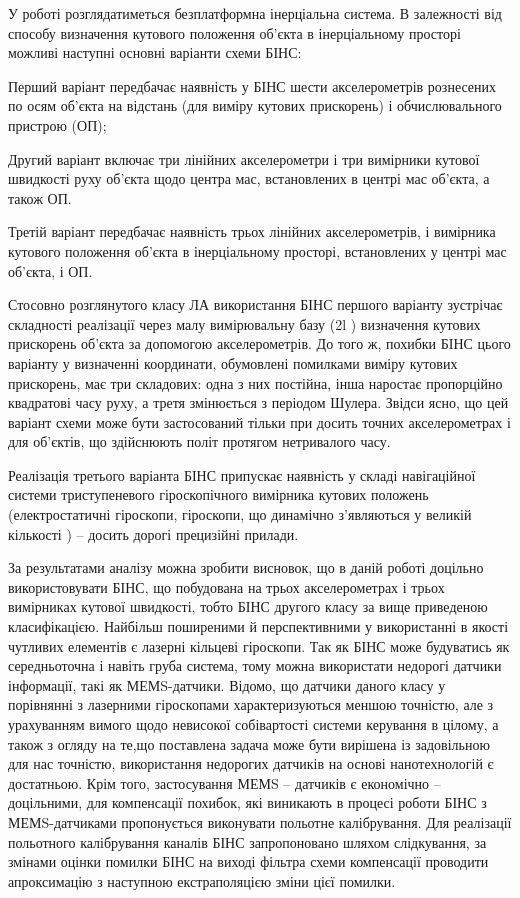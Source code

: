 У роботі розглядатиметься безплатформна інерціальна система.
В залежності від способу визначення кутового положення об'єкта в інерціальному просторі 
можливі наступні основні варіанти схеми БІНС:

Перший варіант передбачає наявність у БІНС шести акселерометрів  рознесених по осям об'єкта на відстань 
(для виміру кутових прискорень) і обчислювального пристрою (ОП);

Другий варіант включає три лінійних акселерометри  і три вимірники кутової 
швидкості руху об'єкта щодо центра мас, встановлених в центрі мас об'єкта, а також ОП.

Третій варіант передбачає наявність трьох лінійних акселерометрів, і вимірника 
кутового положення об'єкта в інерціальному просторі, встановлених у центрі мас об'єкта, і ОП.

Стосовно розглянутого класу ЛА використання БІНС першого варіанту зустрічає складності 
реалізації через малу вимірювальну базу (2l ) визначення кутових прискорень об'єкта за 
допомогою акселерометрів. До того ж, похибки БІНС цього варіанту у визначенні координати, 
обумовлені помилками виміру кутових прискорень, має три складових: одна з них постійна, 
інша наростає пропорційно квадратові часу руху, а третя змінюється з періодом Шулера. 
Звідси ясно, що цей варіант схеми може бути застосований тільки при досить точних 
акселерометрах і для об'єктів, що здійснюють політ протягом нетривалого часу.
 
Реалізація третього варіанта БІНС припускає наявність у складі навігаційної 
системи триступеневого гіроскопічного вимірника кутових положень (електростатичні 
гіроскопи, гіроскопи, що динамічно з’являються у великій кількості ) -- 
досить дорогі  прецизійні прилади. 

За результатами аналізу можна зробити висновок, що в даній роботі доцільно 
використовувати БІНС, що побудована на  трьох акселерометрах  і трьох вимірниках 
кутової швидкості, тобто  БІНС другого класу за вище приведеною класифікацією. 
Найбільш поширеними й перспективними у використанні в якості чутливих елементів є 
лазерні кільцеві гіроскопи. Так як БІНС може будуватись як середньоточна і навіть 
груба система, тому можна використати недорогі датчики інформації, такі як  
МЕМS-датчики. Відомо, що датчики даного класу у порівнянні з лазерними гіроскопами 
характеризуються меншою точністю, але з урахуванням вимого щодо невисокої 
собівартості системи керування в цілому, а також з огляду на те,що поставлена 
задача може бути вирішена із задовільною для нас точністю, використання недорогих 
датчиків на основі нанотехнологій є достатньою. Крім того, застосування МЕМS – 
датчиків є економічно – доцільними, для компенсації похибок, які виникають в 
процесі роботи БІНС з МЕМS-датчиками пропонується виконувати польотне калібрування.
Для реалізації польотного калібрування каналів БІНС запропоновано шляхом слідкування, 
за змінами оцінки помилки БІНС на виході фільтра схеми компенсації проводити 
апроксимацію з наступною екстраполяцією зміни цієї помилки. 

